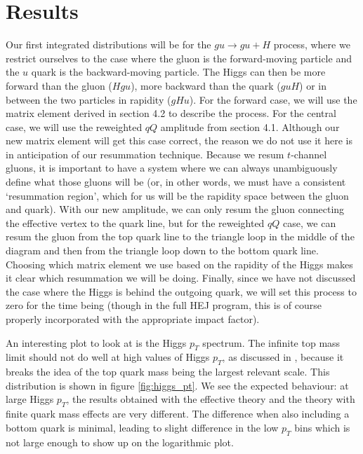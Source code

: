 \section{Results}

Our first integrated distributions will be for the $gu \to gu + H$ process, where we restrict ourselves to the case where the gluon is the forward-moving particle and the $u$ quark is the backward-moving particle. The Higgs can then be more forward than the gluon ($Hgu$), more backward than the quark ($guH$) or in between the two particles in rapidity ($gHu$). For the forward case, we will use the matrix element derived in section 4.2 to describe the process. For the central case, we will use the reweighted $qQ$ amplitude from section 4.1. Although our new matrix element will get this case correct, the reason we do not use it here is in anticipation of our resummation technique. Because we resum $t$-channel gluons, it is important to have a system where we can always unambiguously define what those gluons will be (or, in other words, we must have a consistent `resummation region', which for us will be the rapidity space between the gluon and quark). With our new amplitude, we can only resum the gluon connecting the effective vertex to the quark line, but for the reweighted $qQ$ case, we can resum the gluon from the top quark line to the triangle loop in the middle of the diagram and then from the triangle loop down to the bottom quark line. Choosing which matrix element we use based on the rapidity of the Higgs makes it clear which resummation we will be doing. Finally, since we have not discussed the case where the Higgs is behind the outgoing quark, we will set this process to zero for the time being (though in the full HEJ program, this is of course properly incorporated with the appropriate impact factor). %

An interesting plot to look at is the Higgs $p_T$ spectrum. The infinite top mass limit should not do well at high values of Higgs $p_T$, as discussed in \cite{Duca2003}, because it breaks the idea of the top quark mass being the largest relevant scale. This distribution is shown in figure \ref{fig:higgs_pt}. We see the expected behaviour: at large Higgs $p_T$, the results obtained with the effective theory and the theory with finite quark mass effects are very different. The difference when also including a bottom quark is minimal, leading to slight difference in the low $p_T$ bins which is not large enough to show up on the logarithmic plot. 

